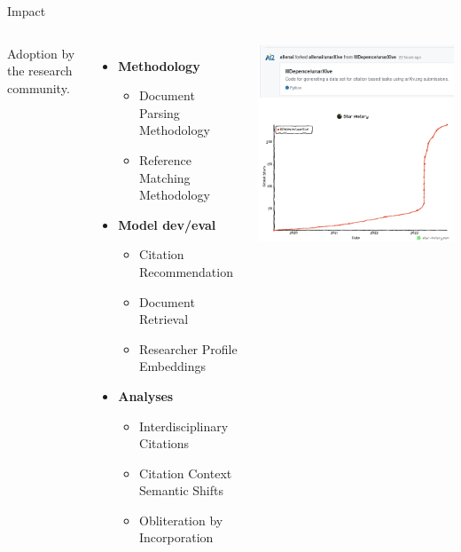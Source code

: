 \documentclass[en,16:9,smallfoot]{sdqbeamer}
\begin{document}
   \begin{frame}{Impact}
   \begin{columns}
        Adoption by the research community.

        \begin{itemize}
            \item \textbf{Methodology}
            \begin{itemize}
                \item Document Parsing Methodology~\cite{Lo2020}
                \item Reference Matching Methodology~\cite{chen2021-scixgen}
            \end{itemize}
            \item \textbf{Model dev/eval}
            \begin{itemize}
                \item Citation Recommendation~\cite{Citcom2021}
                \item Document Retrieval~\cite{Parisot2022}
                \item Researcher Profile Embeddings~\cite{Mochihashi2023}
            \end{itemize}
            \item \textbf{Analyses}
            \begin{itemize}
                \item Interdisciplinary Citations~\cite{Veneri2022}
                \item Citation Context Semantic Shifts~\cite{Xue2021}
                \item Obliteration by Incorporation~\cite{Meng2023}
            \end{itemize}
        \end{itemize}
            \centering
            \includegraphics[width=0.75\linewidth]{imgs/a2ifork}
   \end{columns}
   \end{frame}
\end{document}
